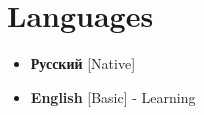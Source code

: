 \section{Languages}
\begin{multicols}{2}
    \begin{itemize}[label=\textbullet]
    \item \textbf{Русский} [Native]
    \item {\textbf{English} [Basic] - Learning}
    \end{itemize}
\end{multicols}